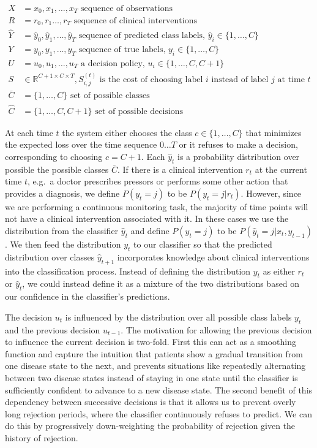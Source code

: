 \documentclass[12pt,solutions]{article}
\newcommand{\yh}{\hat{y}}
\newcommand{\R}{\mathbb{R}}
\begin{document}
\begin{align*}
X &= x_0, x_1, \ldots, x_T \text{ sequence of observations}\\
R &= r_0, r_1 \ldots, r_T \text{ sequence of clinical interventions}\\
\hat{Y} &= \yh_0, \yh_1, \ldots, \yh_T \text{ sequence of predicted class labels, $\yh_i \in \{1,\ldots, C\}$}\\
Y&=y_0,y_1,\ldots,y_T \text{ sequence of true labels, $y_i \in \{1,\ldots, C\}$}\\
U&=u_0,u_1,\ldots,u_T \text{ a decision policy, $u_i \in \{1,\ldots, C, C+1\}$}\\
S &\in \R^{C+1 \times C \times T}, S_{i,j}^{(t)} \text{ is the cost of choosing label $i$ instead of label $j$ at time $t$}\\
\bar{C} &= \{1,\ldots, C\} \text{ set of possible classes}\\
\hat{C} &= \{1,\ldots, C,C+1\} \text{ set of possible decisions}
\end{align*}

At each time $t$ the system either chooses the class $c \in \{1,\ldots, C\}$ that minimizes the expected loss over the time sequence $0\ldots T$ or it refuses to make a decision, corresponding to choosing $c = C+1$. Each $\yh_t$ is a probability distribution over possible the possible classes $\bar{C}$. If there is a clinical intervention $r_t$ at the current time $t$, e.g.\ a doctor prescribes pressors or performs some other action that provides a diagnosis, we define $P(y_t=j)$ to be $P(y_t=j|r_t)$. However, since we are performing a continuous monitoring task, the majority of time points will not have a clinical intervention associated with it. In these cases we use the distribution from the classifier $\yh_t$ and define $P(y_t=j)$ to be $P(\yh_t=j|x_t, y_{t-1})$. We then feed the distribution $y_t$ to our classifier so that the predicted distribution over classes $\yh_{t+1}$ incorporates knowledge about clinical interventions into the classification process. Instead of defining the distribution $y_t$ as either $r_t$ or $\yh_t$, we could instead define it as a mixture of the two distributions based on our confidence in the classifier's predictions. 

The decision $u_t$ is influenced by the distribution over all possible class labels $y_t$ and the previous decision $u_{t-1}$. The motivation for allowing the previous decision to influence the current decision is two-fold. First this can act as a smoothing function and capture the intuition that patients show a gradual transition from one disease state to the next, and prevents situations like repeatedly alternating between two disease states instead of staying in one state until the classifier is sufficiently confident to advance to a new disease state. The second benefit of this dependency between successive decisions is that it allows us to prevent overly long rejection periods, where the classifier continuously refuses to predict. We can do this by progressively down-weighting the probability of rejection given the history of rejection.
\end{document}
